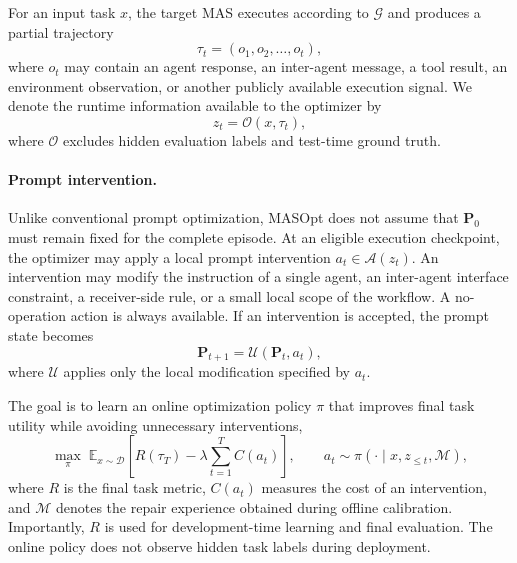 For an input task $x$, the target MAS executes according to $\mathcal{G}$ and produces a partial trajectory
\begin{equation}
    \tau_t =
    \left(o_1,o_2,\ldots,o_t\right),
\end{equation}
where $o_t$ may contain an agent response, an inter-agent message, a tool result, an environment observation, or another publicly available execution signal.
We denote the runtime information available to the optimizer by
\begin{equation}
    z_t = \mathcal{O}(x,\tau_t),
\end{equation}
where $\mathcal{O}$ excludes hidden evaluation labels and test-time ground truth.

\paragraph{Prompt intervention.}
Unlike conventional prompt optimization, MASOpt does not assume that $\mathbf{P}_0$ must remain fixed for the complete episode.
At an eligible execution checkpoint, the optimizer may apply a local prompt intervention
$a_t\in\mathcal{A}(z_t)$.
An intervention may modify the instruction of a single agent, an inter-agent interface constraint, a receiver-side rule, or a small local scope of the workflow.
A no-operation action is always available.
If an intervention is accepted, the prompt state becomes
\begin{equation}
    \mathbf{P}_{t+1}
    =
    \mathcal{U}(\mathbf{P}_t,a_t),
    \label{eq:prompt_update}
\end{equation}
where $\mathcal{U}$ applies only the local modification specified by $a_t$.

The goal is to learn an online optimization policy $\pi$ that improves final task utility while avoiding unnecessary interventions,
\begin{equation}
    \max_{\pi}\;
    \mathbb{E}_{x\sim\mathcal{D}}
    \left[
        R(\tau_T)
        -
        \lambda
        \sum_{t=1}^{T} C(a_t)
    \right],
    \qquad
    a_t\sim\pi(\cdot\mid x,z_{\leq t},\mathcal{M}),
    \label{eq:objective}
\end{equation}
where $R$ is the final task metric, $C(a_t)$ measures the cost of an intervention, and $\mathcal{M}$ denotes the repair experience obtained during offline calibration.
Importantly, $R$ is used for development-time learning and final evaluation.
The online policy does not observe hidden task labels during deployment.

